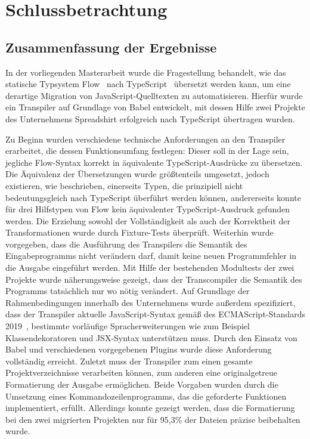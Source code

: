 \chapter{Schlussbetrachtung}
\label{chap:conclusion}

\section{Zusammenfassung der Ergebnisse}

In der vorliegenden Masterarbeit wurde die Fragestellung behandelt, wie das statische Typsystem Flow~\autocite{FLOW:PAPER} nach TypeScript~\autocite{TYPESCRIPT:SPEC} übersetzt werden kann, um eine derartige Migration von JavaScript-Quelltexten zu automatisieren. Hierfür wurde ein Transpiler auf Grundlage von Babel entwickelt, mit dessen Hilfe zwei Projekte des Unternehmens Spreadshirt erfolgreich nach TypeScript übertragen wurden.

Zu Beginn wurden verschiedene technische Anforderungen an den Transpiler erarbeitet, die dessen Funktionsumfang festlegen:
Dieser soll in der Lage sein, jegliche Flow-Syntax korrekt in äquivalente TypeScript-Ausdrücke zu übersetzen. Die Äquivalenz der Übersetzungen wurde größtenteils umgesetzt, jedoch existieren, wie beschrieben, einerseits Typen, die prinzipiell nicht bedeutungsgleich nach TypeScript überführt werden können, andererseits konnte für drei Hilfstypen von Flow kein äquivalenter TypeScript-Ausdruck gefunden werden. Die Erzielung sowohl der Vollständigkeit als auch der Korrektheit der Transformationen wurde durch Fixture-Tests überprüft.
Weiterhin wurde vorgegeben, dass die Ausführung des Transpilers die Semantik des Eingabeprogramms nicht verändern darf, damit keine neuen Programmfehler in die Ausgabe eingeführt werden. Mit Hilfe der bestehenden Modultests der zwei Projekte wurde näherungsweise gezeigt, dass der Transcompiler die Semantik des Programms tatsächlich nur wo nötig verändert.
Auf Grundlage der Rahmenbedingungen innerhalb des Unternehmens wurde außerdem spezifiziert, dass der Transpiler aktuelle JavaScript-Syntax gemäß des ECMAScript-Standards 2019~\autocite{ECMASCRIPT:2019}, bestimmte vorläufige Spracherweiterungen wie zum Beispiel Klassendekoratoren und JSX-Syntax unterstützen muss. Durch den Einsatz von Babel und verschiedenen vorgegebenen Plugins wurde diese Anforderung vollständig erreicht.
Zuletzt muss der Transpiler zum einen gesamte Projektverzeichnisse verarbeiten können, zum anderen eine originalgetreue Formatierung der Ausgabe ermöglichen. Beide Vorgaben wurden durch die Umsetzung eines Kommandozeilenprogramms, das die geforderte Funktionen implementiert, erfüllt. Allerdings konnte gezeigt werden, dass die Formatierung bei den zwei migrierten Projekten nur für 95,3\% der Dateien präzise beibehalten wurde.

